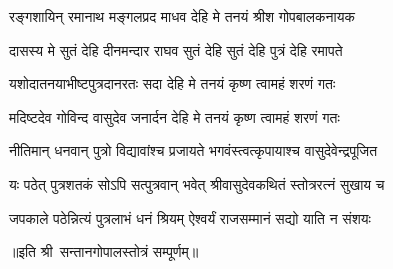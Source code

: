 \twolineshloka
{रङ्गशायिन् रमानाथ मङ्गलप्रद माधव}
{देहि मे तनयं श्रीश गोपबालकनायक}%

\twolineshloka
{दासस्य मे सुतं देहि दीनमन्दार राघव}
{सुतं देहि सुतं देहि पुत्रं देहि रमापते}%

\twolineshloka
{यशोदातनयाभीष्टपुत्रदानरतः सदा}
{देहि मे तनयं कृष्ण त्वामहं शरणं गतः}%

\twolineshloka
{मदिष्टदेव गोविन्द वासुदेव जनार्दन}
{देहि मे तनयं कृष्ण त्वामहं शरणं गतः}%

\twolineshloka
{नीतिमान् धनवान् पुत्रो विद्यावांश्च प्रजायते}
{भगवंस्त्वत्कृपायाश्च वासुदेवेन्द्रपूजित}%

\twolineshloka
{यः पठेत् पुत्रशतकं सोऽपि सत्पुत्रवान् भवेत्}
{श्रीवासुदेवकथितं स्तोत्ररत्नं सुखाय च}%

\twolineshloka
{जपकाले पठेन्नित्यं पुत्रलाभं धनं श्रियम्}
{ऐश्वर्यं राजसम्मानं सद्यो याति न संशयः}%

{॥इति श्री~सन्तानगोपालस्तोत्रं सम्पूर्णम्॥}